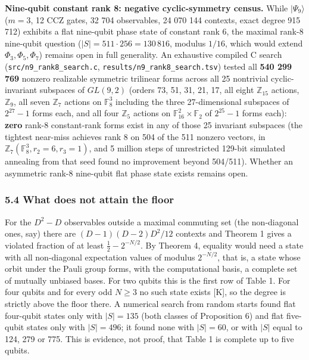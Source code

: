 \documentclass[11pt,a4paper]{article}
\begin{document}
\textbf{Nine-qubit constant rank 8: negative cyclic-symmetry census.} While \(|\Psi_9\rangle\) (\(m=3\), 12 CCZ
gates, 32 704 observables, 24 070 144 contexts, exact degree 915 712) exhibits a flat nine-qubit phase
state of constant rank 6, the maximal rank-8 nine-qubit question (\(|S| = 511 \cdot 256 = 130\,816\),
modulus \(1/16\), which would extend \(\Phi_3, \Phi_5, \Phi_7\)) remains open in full generality. An
exhaustive compiled C search (\nolinkurl{src/n9_rank8_search.c}, \nolinkurl{results/n9_rank8_search.tsv}) tested all
\textbf{540 299 769} nonzero realizable symmetric trilinear forms across all 25 nontrivial cyclic-invariant
subspaces of \(GL(9,2)\) (orders 73, 51, 31, 21, 17, all eight \(\mathbb{Z}_{15}\) actions, \(\mathbb{Z}_9\),
all seven \(\mathbb{Z}_7\) actions on \(\mathbb{F}_8^3\) including the three 27-dimensional subspaces of
\(2^{27}-1\) forms each, and all four \(\mathbb{Z}_5\) actions on \(\mathbb{F}_{16}^2 \times \mathbb{F}_2\)
of \(2^{25}-1\) forms each): \textbf{zero} rank-8 constant-rank forms exist in any of those 25 invariant
subspaces (the tightest near-miss achieves rank 8 on 504 of the 511 nonzero vectors, in
\(\mathbb{Z}_7(\mathbb{F}_8^3, r_2=6, r_3=1)\), and 5 million steps of unrestricted 129-bit simulated
annealing from that seed found no improvement beyond 504/511). Whether an asymmetric rank-8 nine-qubit
flat phase state exists remains open.

\subsubsection{5.4 What does not attain the floor}\label{54-what-does-not-attain-the-floor}

For the \(D^2 - D\) observables outside a maximal commuting set (the
non-diagonal ones, say) there are \((D-1)(D-2)D^2/12\) contexts and Theorem 1 gives a violated fraction of
at least \(\tfrac12 - 2^{-N/2}\). By Theorem 4, equality would need a state with all non-diagonal
expectation values of modulus \(2^{-N/2}\), that is, a state whose orbit under the Pauli group forms,
with the computational basis, a complete set of mutually unbiased bases. For two qubits this is the
first row of Table 1. For four qubits and for every odd \(N \ge 3\) no such state exists {[}K{]}, so the
degree is strictly above the floor there. A numerical search from random starts found flat four-qubit
states only with \(|S| = 135\) (both classes of Proposition 6) and flat five-qubit states only with
\(|S| = 496\); it found none with \(|S| = 60\), or with \(|S|\) equal to 124, 279 or 775. This is evidence, not
proof, that Table 1 is complete up to five qubits.
\end{document}
